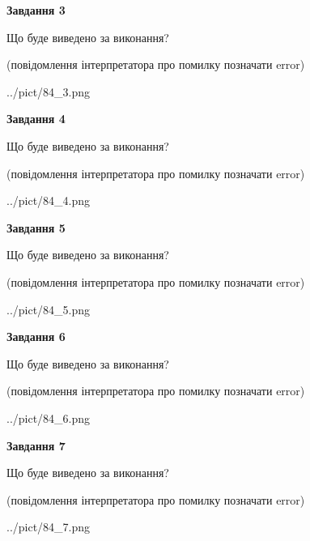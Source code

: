 \documentclass[12pt, ukrainian]{article}
\begin{document}
{\begin {large}
{\begin {center}\textbf{Завдання 3}\end {center}}\par
Що буде виведено за виконання?\par
 (повідомлення інтерпретатора про помилку позначати error)\par
\begin{center}
	{../pict/84_3.png}
\end{center}
\newpage

{\begin {center}\textbf{Завдання 4}\end {center}}\par
Що буде виведено за виконання?\par
 (повідомлення інтерпретатора про помилку позначати error)\par
\begin{center}
	{../pict/84_4.png}
\end{center}
\newpage

{\begin {center}\textbf{Завдання 5}\end {center}}\par
Що буде виведено за виконання?\par
 (повідомлення інтерпретатора про помилку позначати error)\par
\begin{center}
	{../pict/84_5.png}
\end{center}
\newpage

{\begin {center}\textbf{Завдання 6}\end {center}}\par
Що буде виведено за виконання?\par
 (повідомлення інтерпретатора про помилку позначати error)\par
\begin{center}
	{../pict/84_6.png}
\end{center}
\newpage

{\begin {center}\textbf{Завдання 7}\end {center}}\par
Що буде виведено за виконання?\par
 (повідомлення інтерпретатора про помилку позначати error)\par
\begin{center}
	{../pict/84_7.png}
\end{center}
\newpage


\end{large}}
\end{document}
